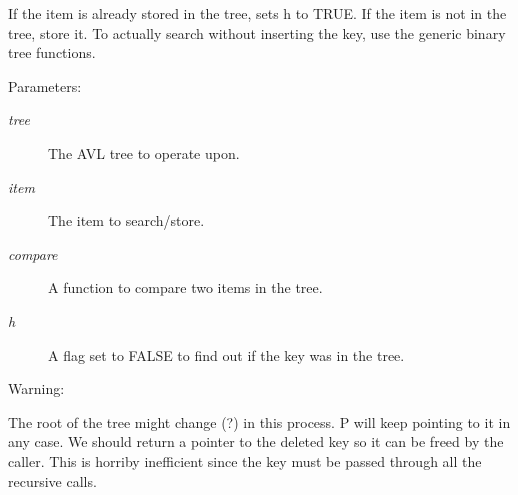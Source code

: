  If the item is already stored in the tree, sets h to TRUE. If the item is not in the tree, store it. To actually search without inserting the key, use the generic binary tree functions.\begin{Desc}
\item[Parameters: ]\par
\begin{description}
\item[{\em 
tree}]The AVL tree to operate upon. \item[{\em 
item}]The item to search/store. \item[{\em 
compare}]A function to compare two items in the tree. \item[{\em 
h}]A flag set to FALSE to find out if the key was in the tree.\end{description}
\end{Desc}
\begin{Desc}
\item[Warning: ]\par
 The root of the tree might change (?) in this process. P will keep pointing to it in any case. We should return a pointer to the deleted key so it can be freed by the caller. This is horriby inefficient since the key must be passed through all the recursive calls. \end{Desc}
